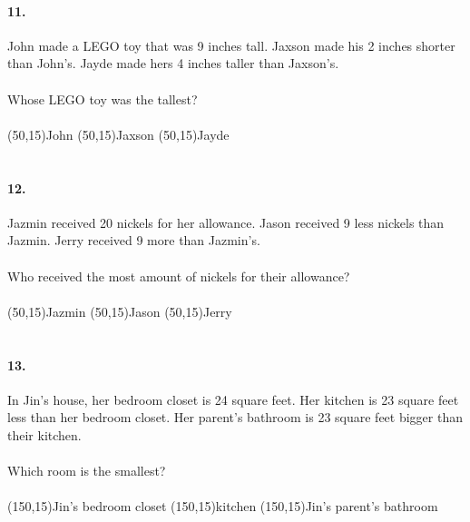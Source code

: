 \documentclass[12pt]{article}
\begin{document}
\paragraph{11.}
John made a LEGO toy that was 9 inches tall. Jaxson made his 2 inches shorter than John's. Jayde made hers 4 inches taller than Jaxson's.
\\
\\
Whose LEGO toy was the tallest?
\\
\\
\framebox(50,15){John} \framebox(50,15){Jaxson} \framebox(50,15){Jayde}
\\
\\
\paragraph{12.}
Jazmin received 20 nickels for her allowance. Jason received 9 less nickels than Jazmin. Jerry received 9 more than Jazmin's.
\\
\\
Who received the most amount of nickels for their allowance?
\\
\\
\framebox(50,15){Jazmin} \framebox(50,15){Jason} \framebox(50,15){Jerry}
\\
\\
\paragraph{13.}
In Jin's house, her bedroom closet is 24 square feet. Her kitchen is 23 square feet less than her bedroom closet. Her parent's bathroom is 23 square feet bigger than their kitchen.
\\
\\
Which room is the smallest?
\\
\\
\framebox(150,15){Jin's bedroom closet} \framebox(150,15){kitchen} \framebox(150,15){Jin's parent's bathroom}
\end{document}
